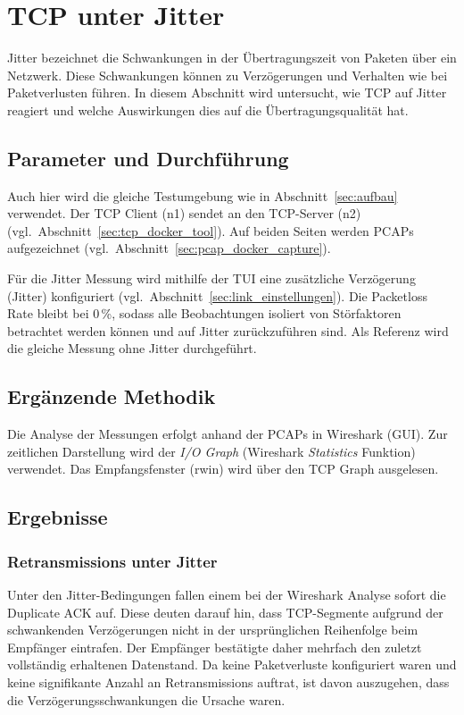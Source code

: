 \FloatBarrier
\section{TCP unter Jitter}
Jitter bezeichnet die Schwankungen in der Übertragungszeit von Paketen über ein Netzwerk.
Diese Schwankungen können zu Verzögerungen und Verhalten wie bei Paketverlusten führen.
In diesem Abschnitt wird untersucht, wie TCP auf Jitter reagiert und welche Auswirkungen dies auf die Übertragungsqualität hat.

\subsection{Parameter und Durchführung}

Auch hier wird die gleiche Testumgebung wie in Abschnitt~\ref{sec:aufbau} verwendet.
Der TCP Client (n1) sendet an den TCP-Server (n2) (vgl.\ Abschnitt~\ref{sec:tcp_docker_tool}).
Auf beiden Seiten werden PCAPs aufgezeichnet (vgl.\ Abschnitt~\ref{sec:pcap_docker_capture}).

Für die Jitter Messung wird mithilfe der TUI eine zusätzliche Verzögerung (Jitter) konfiguriert (vgl.\ Abschnitt~\ref{sec:link_einstellungen}).
Die Packetloss Rate bleibt bei 0\,\%, sodass alle Beobachtungen isoliert von Störfaktoren betrachtet werden können und auf Jitter zurückzuführen sind.
Als Referenz wird die gleiche Messung ohne Jitter durchgeführt.

\subsection{Ergänzende Methodik}

Die Analyse der Messungen erfolgt anhand der PCAPs in Wireshark (GUI).
Zur zeitlichen Darstellung wird der \textit{I/O Graph} (Wireshark \textit{Statistics} Funktion) verwendet.
Das Empfangsfenster (rwin) wird über den TCP Graph ausgelesen.

\subsection{Ergebnisse}

\subsubsection{Retransmissions unter Jitter}
Unter den Jitter-Bedingungen fallen einem bei der Wireshark Analyse sofort die Duplicate ACK auf.
Diese deuten darauf hin, dass TCP-Segmente aufgrund der schwankenden Verzögerungen nicht in der ursprünglichen Reihenfolge beim Empfänger eintrafen.
Der Empfänger bestätigte daher mehrfach den zuletzt vollständig erhaltenen Datenstand.
Da keine Paketverluste konfiguriert waren und keine signifikante Anzahl an Retransmissions auftrat, ist davon auszugehen, dass die Verzögerungsschwankungen die Ursache waren.

